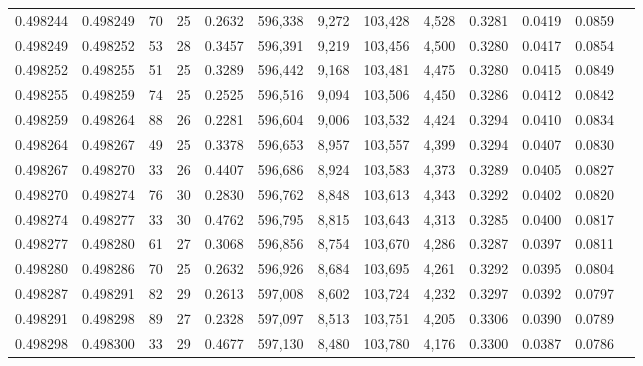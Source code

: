 \begin{tabular}{rrrrrrrrrrrrr}
0.498244 & 0.498249 &  70 &  25 &                                     0.2632 & 596,338 &   9,272 & 103,428 &   4,528 & 0.3281 & 0.0419 & 0.0859 \\
0.498249 & 0.498252 &  53 &  28 &                                     0.3457 & 596,391 &   9,219 & 103,456 &   4,500 & 0.3280 & 0.0417 & 0.0854 \\
0.498252 & 0.498255 &  51 &  25 &                                     0.3289 & 596,442 &   9,168 & 103,481 &   4,475 & 0.3280 & 0.0415 & 0.0849 \\
0.498255 & 0.498259 &  74 &  25 &                                     0.2525 & 596,516 &   9,094 & 103,506 &   4,450 & 0.3286 & 0.0412 & 0.0842 \\
0.498259 & 0.498264 &  88 &  26 &                                     0.2281 & 596,604 &   9,006 & 103,532 &   4,424 & 0.3294 & 0.0410 & 0.0834 \\
0.498264 & 0.498267 &  49 &  25 &                                     0.3378 & 596,653 &   8,957 & 103,557 &   4,399 & 0.3294 & 0.0407 & 0.0830 \\
0.498267 & 0.498270 &  33 &  26 &                                     0.4407 & 596,686 &   8,924 & 103,583 &   4,373 & 0.3289 & 0.0405 & 0.0827 \\
0.498270 & 0.498274 &  76 &  30 &                                     0.2830 & 596,762 &   8,848 & 103,613 &   4,343 & 0.3292 & 0.0402 & 0.0820 \\
0.498274 & 0.498277 &  33 &  30 &                                     0.4762 & 596,795 &   8,815 & 103,643 &   4,313 & 0.3285 & 0.0400 & 0.0817 \\
0.498277 & 0.498280 &  61 &  27 &                                     0.3068 & 596,856 &   8,754 & 103,670 &   4,286 & 0.3287 & 0.0397 & 0.0811 \\
0.498280 & 0.498286 &  70 &  25 &                                     0.2632 & 596,926 &   8,684 & 103,695 &   4,261 & 0.3292 & 0.0395 & 0.0804 \\
0.498287 & 0.498291 &  82 &  29 &                                     0.2613 & 597,008 &   8,602 & 103,724 &   4,232 & 0.3297 & 0.0392 & 0.0797 \\
0.498291 & 0.498298 &  89 &  27 &                                     0.2328 & 597,097 &   8,513 & 103,751 &   4,205 & 0.3306 & 0.0390 & 0.0789 \\
0.498298 & 0.498300 &  33 &  29 &                                     0.4677 & 597,130 &   8,480 & 103,780 &   4,176 & 0.3300 & 0.0387 & 0.0786 \\

\end{tabular}
